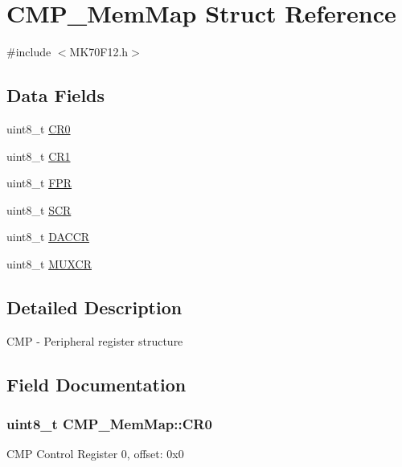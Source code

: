 \hypertarget{struct_c_m_p___mem_map}{}\section{C\+M\+P\+\_\+\+Mem\+Map Struct Reference}
\label{struct_c_m_p___mem_map}


{\ttfamily \#include $<$M\+K70\+F12.\+h$>$}

\subsection*{Data Fields}
\begin{DoxyCompactItemize}
\item 
uint8\+\_\+t \hyperlink{struct_c_m_p___mem_map_ad56a4dbaba4426c89e4d9b256173ab84}{C\+R0}
\item 
uint8\+\_\+t \hyperlink{struct_c_m_p___mem_map_ab790f5d18ef53ba0c9cfc2b5f3ce6668}{C\+R1}
\item 
uint8\+\_\+t \hyperlink{struct_c_m_p___mem_map_aa793447f43fa77759b6eaf1620bed4bc}{F\+P\+R}
\item 
uint8\+\_\+t \hyperlink{struct_c_m_p___mem_map_a3fe55f0243869b50fc54acb9c194d970}{S\+C\+R}
\item 
uint8\+\_\+t \hyperlink{struct_c_m_p___mem_map_a64ad86546fe53058b6fdd5ca1252f7c2}{D\+A\+C\+C\+R}
\item 
uint8\+\_\+t \hyperlink{struct_c_m_p___mem_map_a3b48de300c4b4116ebb942659a2948a2}{M\+U\+X\+C\+R}
\end{DoxyCompactItemize}


\subsection{Detailed Description}
C\+M\+P -\/ Peripheral register structure 

\subsection{Field Documentation}
\hypertarget{struct_c_m_p___mem_map_ad56a4dbaba4426c89e4d9b256173ab84}{}
\subsubsection[{C\+R0}]{\setlength{\rightskip}{0pt plus 5cm}uint8\+\_\+t C\+M\+P\+\_\+\+Mem\+Map\+::\+C\+R0}\label{struct_c_m_p___mem_map_ad56a4dbaba4426c89e4d9b256173ab84}
C\+M\+P Control Register 0, offset\+: 0x0 \hypertarget{struct_c_m_p___mem_map_ab790f5d18ef53ba0c9cfc2b5f3ce6668}{}
